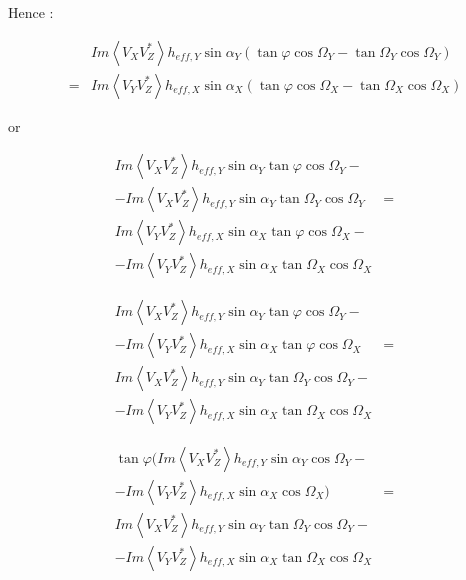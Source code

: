 \documentclass[a4paper,14pt]{extbook}
\begin{document}
Hence :

\begin{eqnarray}
& & Im \left\langle V_X V_Z^{*}\right\rangle h_{eff,Y} \sin \alpha_Y ( \tan \varphi \cos \Omega_Y-\tan \Omega_Y \cos \Omega_Y) \\
&=& Im \left\langle V_Y V_Z^{*}\right\rangle h_{eff,X} \sin \alpha_X (\tan \varphi \cos \Omega_X-\tan \Omega_X \cos \Omega_X) \nonumber
\end{eqnarray}

or

\begin{eqnarray}
 Im \left\langle V_X V_Z^{*}\right\rangle h_{eff,Y} \sin \alpha_Y \tan \varphi \cos \Omega_Y - & &\\
 -Im \left\langle V_X V_Z^{*}\right\rangle h_{eff,Y} \sin \alpha_Y \tan \Omega_Y \cos \Omega_Y &=&\nonumber\\
 Im \left\langle V_Y V_Z^{*}\right\rangle h_{eff,X} \sin \alpha_X \tan \varphi \cos \Omega_X - & &\nonumber \\
 -Im \left\langle V_Y V_Z^{*}\right\rangle h_{eff,X} \sin \alpha_X \tan \Omega_X \cos \Omega_X & &\nonumber
\end{eqnarray}

\begin{eqnarray}
 Im \left\langle V_X V_Z^{*}\right\rangle h_{eff,Y} \sin \alpha_Y \tan \varphi \cos \Omega_Y-& &\\
 -Im \left\langle V_Y V_Z^{*}\right\rangle h_{eff,X} \sin \alpha_X \tan \varphi \cos \Omega_X &=&\nonumber \\
 Im \left\langle V_X V_Z^{*}\right\rangle h_{eff,Y} \sin \alpha_Y \tan \Omega_Y \cos \Omega_Y - & &\nonumber\\
 -Im \left\langle V_Y V_Z^{*}\right\rangle h_{eff,X} \sin \alpha_X \tan \Omega_X \cos \Omega_X & &\nonumber
\end{eqnarray}

\begin{eqnarray}
\tan \varphi  (Im \left\langle V_X V_Z^{*}\right\rangle h_{eff,Y} \sin \alpha_Y \cos \Omega_Y-& &\\
 -Im \left\langle V_Y V_Z^{*}\right\rangle h_{eff,X} \sin \alpha_X  \cos \Omega_X) &=&\nonumber \\
 Im \left\langle V_X V_Z^{*}\right\rangle h_{eff,Y} \sin \alpha_Y \tan \Omega_Y \cos \Omega_Y -& &\nonumber\\
 -Im \left\langle V_Y V_Z^{*}\right\rangle h_{eff,X} \sin \alpha_X \tan \Omega_X \cos \Omega_X & &\nonumber
\end{eqnarray}
\end{document}
